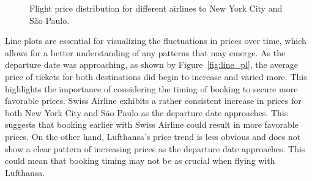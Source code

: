 \begin{figure}
    \centering
    \caption{Flight price distribution for different airlines to New York City and São Paulo.}
    \label{fig:box}
\end{figure}

Line plots are essential for visualizing the fluctuations in prices over time, which allows for a better understanding of any patterns that may emerge.
As the departure date was approaching, as shown by Figure~\ref{fig:line_pl}, the average price of tickets for both destinations did begin to increase and varied more.
This highlights the importance of considering the timing of booking to secure more favorable prices.
Swiss Airline exhibits a rather consistent increase in prices for both New York City and São Paulo as the departure date approaches.
This suggests that booking earlier with Swiss Airline could result in more favorable prices.
On the other hand, Lufthansa's price trend is less obvious and does not show a clear pattern of increasing prices as the departure date approaches.
This could mean that booking timing may not be as crucial when flying with Lufthansa.

